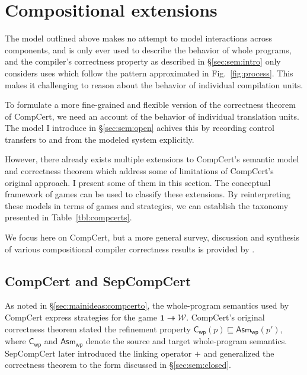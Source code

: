 \documentclass[11pt,oneside,draft]{book}
\theoremstyle{definition}
\newcommand{\kw}[1]{\ensuremath{ \mathsf{#1} }}
\newcommand{\refby}{\sqsubseteq} %
\begin{document}


\section{Compositional extensions} \label{sec:compcert-ext} %

The model outlined above
makes no attempt to model interactions across components,
and is only ever used to
describe the behavior of whole programs,
and the compiler's correctness property
as described in \S\ref{sec:sem:intro}
only considers uses which follow
the pattern approximated in Fig.~\ref{fig:process}.
This makes it challenging to reason about
the behavior of individual compilation units.

To formulate a more fine-grained and flexible
version of the correctness theorem of CompCert,
we need an account of
the behavior of individual translation units.
The model I introduce in \S\ref{sec:sem:open}
achives this by recording control transfers
to and from the modeled system explicitly.

However,
there already exists multiple extensions
to CompCert's semantic model
and correctness theorem
which address some of limitations
of CompCert's original approach.
I present some of them in this section.
The conceptual framework of games
can be used to classify these extensions.
By reinterpreting these models
in terms of games and strategies,
we can establish the taxonomy presented in
Table~\ref{tbl:compcerts}.

We focus here on CompCert,
but a more general survey,
discussion and synthesis of various
compositional compiler correctness results
is provided by \citet{next700}.

\subsection{CompCert and SepCompCert} %

As noted in \S\ref{sec:mainideas:compcerto},
the whole-program semantics used by CompCert
express strategies for the game
$\mathbf{1} \twoheadrightarrow \mathcal{W}$.
CompCert's original correctness theorem
stated the refinement property
$\kw{C}_\kw{wp}(p) \refby \kw{Asm}_\kw{wp}(p')$,
where $\kw{C}_\kw{wp}$ and $\kw{Asm}_\kw{wp}$
denote the source and target whole-program semantics.
SepCompCert \citep{sepcompcert}
later introduced the linking operator $+$
and generalized the correctness theorem to
the form discussed in \S\ref{sec:sem:closed}.
\end{document}
